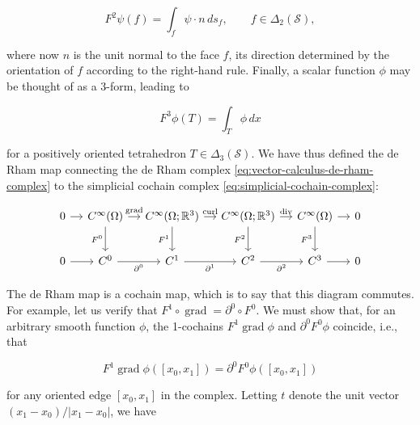 \[
F^2\psi(f)=\int_f\psi\cdot n\,ds_f,\qquad f\in\Delta_2(\mathcal S),
\]

{where now $n$ is the unit normal to the face $f$, its direction determined by the orientation of $f$ according to the right-hand rule. Finally, a scalar function $\phi$ may be thought of as a 3-form, leading to}

\[
F^3\phi(T)=\int_T\phi\,dx
\]

{for a positively oriented tetrahedron $T\in\Delta_3(\mathcal S)$. We have thus defined the de Rham map connecting the de Rham complex \eqref{eq:vector-calculus-de-rham-complex} to the simplicial cochain complex \eqref{eq:simplicial-cochain-complex}:}

\begin{equation}\label{eq:de-rham-commuting-map}
\begin{tikzcd}[column sep=1.1em,row sep=2.2em]
0 \arrow[r] & C^\infty(\Omega) \arrow[r,"\operatorname{grad}"] \arrow[d,"F^0"'] & C^\infty(\Omega;\mathbb R^3) \arrow[r,"\operatorname{curl}"] \arrow[d,"F^1"'] & C^\infty(\Omega;\mathbb R^3) \arrow[r,"\operatorname{div}"] \arrow[d,"F^2"'] & C^\infty(\Omega) \arrow[r] \arrow[d,"F^3"'] & 0 \\
0 \arrow[r] & C^0 \arrow[r,"\partial^0"'] & C^1 \arrow[r,"\partial^1"'] & C^2 \arrow[r,"\partial^2"'] & C^3 \arrow[r] & 0
\end{tikzcd}
\end{equation}

{The de Rham map is a cochain map, which is to say that this diagram commutes. For example, let us verify that $F^1\circ\operatorname{grad}=\partial^0\circ F^0$. We must show that, for an arbitrary smooth function $\phi$, the 1-cochains $F^1\operatorname{grad}\phi$ and $\partial^0F^0\phi$ coincide, i.e., that}

\[
F^1\operatorname{grad}\phi([x_0,x_1])=\partial^0F^0\phi([x_0,x_1])
\]

{for any oriented edge $[x_0,x_1]$ in the complex. Letting $t$ denote the unit vector $(x_1-x_0)/|x_1-x_0|$, we have}

